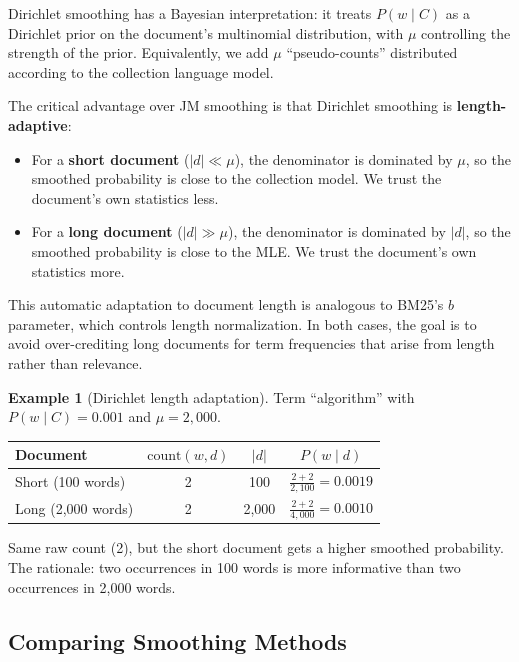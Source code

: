 \documentclass[11pt,a4paper]{article}
\theoremstyle{definition}
\newtheorem{example}{Example}[section]
\theoremstyle{plain}
\begin{document}
Dirichlet smoothing has a Bayesian interpretation: it treats $P(w \mid C)$ as a Dirichlet prior on the document's multinomial distribution, with $\mu$ controlling the strength of the prior. Equivalently, we add $\mu$ ``pseudo-counts'' distributed according to the collection language model.

The critical advantage over JM smoothing is that Dirichlet smoothing is \textbf{length-adaptive}:
\begin{itemize}
    \item For a \textbf{short document} ($|d| \ll \mu$), the denominator is dominated by $\mu$, so the smoothed probability is close to the collection model. We trust the document's own statistics less.
    \item For a \textbf{long document} ($|d| \gg \mu$), the denominator is dominated by $|d|$, so the smoothed probability is close to the MLE. We trust the document's own statistics more.
\end{itemize}

This automatic adaptation to document length is analogous to BM25's $b$ parameter, which controls length normalization. In both cases, the goal is to avoid over-crediting long documents for term frequencies that arise from length rather than relevance.

\begin{example}[Dirichlet length adaptation]
\label{ex:dirichlet}
Term ``algorithm'' with $P(w \mid C) = 0.001$ and $\mu = 2{,}000$.

\begin{center}
\begin{tabular}{lccc}
\toprule
\textbf{Document} & $\text{count}(w, d)$ & $|d|$ & $P(w \mid d)$ \\
\midrule
Short (100 words) & 2 & 100 & $\frac{2 + 2}{2{,}100} = 0.0019$ \\
Long (2{,}000 words) & 2 & 2{,}000 & $\frac{2 + 2}{4{,}000} = 0.0010$ \\
\bottomrule
\end{tabular}
\end{center}

Same raw count (2), but the short document gets a higher smoothed probability. The rationale: two occurrences in 100 words is more informative than two occurrences in 2{,}000 words.
\end{example}

\subsection{Comparing Smoothing Methods}
\end{document}
